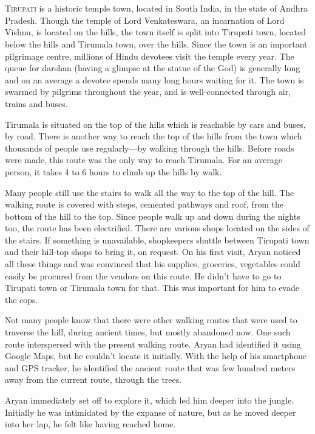 \chapter{}

\lettrine{T}{irupati} is a historic temple town, located in South India, in the
state of Andhra Pradesh. Though the temple of Lord Venkateswara, an incarnation
of Lord Vishnu, is located on the hills, the town itself is split into Tirupati
town, located below the hills and Tirumala town, over the hills. Since the town
is an important pilgrimage centre, millions of Hindu devotees visit the temple
every year. The queue for darshan (having a glimpse at the statue of the God) is
generally long and on an average a devotee spends many long hours waiting for
it. The town is swarmed by pilgrims throughout the year, and is well-connected
through air, trains and buses.

Tirumala is situated on the top of the hills which is reachable by cars and
buses, by road. There is another way to reach the top of the hills from the town
which thousands of people use regularly—by walking through the hills. Before
roads were made, this route was the only way to reach Tirumala. For an average
person, it takes 4 to 6 hours to climb up the hills by walk.

Many people still use the stairs to walk all the way to the top of the hill. The
walking route is covered with steps, cemented pathways and roof, from the bottom
of the hill to the top. Since people walk up and down during the nights too, the
route has been electrified. There are various shops located on the sides of the
stairs. If something is unavailable, shopkeepers shuttle between Tirupati town
and their hill-top shops to bring it, on request. On his first visit, Aryan
noticed all these things and was convinced that his supplies, groceries,
vegetables could easily be procured from the vendors on this route. He didn't
have to go to Tirupati town or Tirumala town for that. This was important for
him to evade the cops.

Not many people know that there were other walking routes that were used to
traverse the hill, during ancient times, but mostly abandoned now. One such
route interspersed with the present walking route. Aryan had identified it using
Google Maps, but he couldn't locate it initially. With the help of his
smartphone and GPS tracker, he identified the ancient route that was few hundred
meters away from the current route, through the trees.

Aryan immediately set off to explore it, which led him deeper into the jungle.
Initially he was intimidated by the expanse of nature, but as he moved deeper
into her lap, he felt like having reached home.


